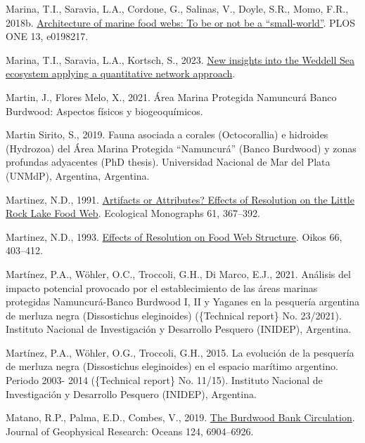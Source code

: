 \documentclass[
]{article}
\newlength{\cslhangindent}
\newenvironment{CSLReferences}[2] %
 {\begin{list}{}{%
  \setlength{\itemindent}{0pt}
  \setlength{\leftmargin}{0pt}
  \setlength{\parsep}{0pt}
  \ifodd #1
   \setlength{\leftmargin}{\cslhangindent}
   \setlength{\itemindent}{-1\cslhangindent}
  \fi
  \setlength{\itemsep}{#2\baselineskip}}}
 {\end{list}}
\begin{document}
\begin{CSLReferences}{1}{0}
Marina, T.I., Saravia, L.A., Cordone, G., Salinas, V., Doyle, S.R.,
Momo, F.R., 2018b.
\href{https://doi.org/10.1371/journal.pone.0198217}{Architecture of
marine food webs: {To} be or not be a {``small-world''}}. PLOS ONE 13,
e0198217.

Marina, T.I., Saravia, L.A., Kortsch, S., 2023.
\href{https://doi.org/10.5194/egusphere-2022-1518}{New insights into the
{Weddell Sea} ecosystem applying a quantitative network approach}.

Martin, J., Flores Melo, X., 2021. {{Á}rea Marina Protegida Namuncur{á}
Banco Burdwood: Aspectos f{í}sicos y biogeoqu{í}micos}.

Martin Sirito, S., 2019. {Fauna asociada a corales (Octocorallia) e
hidroides (Hydrozoa) del {Á}rea Marina Protegida {``Namuncur{á}''}
(Banco Burdwood) y zonas profundas adyacentes} (PhD thesis). Universidad
Nacional de Mar del Plata (UNMdP), Argentina, {Argentina}.

Martinez, N.D., 1991. \href{https://doi.org/10.2307/2937047}{Artifacts
or {Attributes}? {Effects} of {Resolution} on the {Little Rock Lake Food
Web}}. Ecological Monographs 61, 367--392.

Martinez, N.D., 1993. \href{https://doi.org/10.2307/3544934}{Effects of
{Resolution} on {Food Web Structure}}. Oikos 66, 403--412.

Martínez, P.A., Wöhler, O.C., Troccoli, G.H., Di Marco, E.J., 2021.
{An{á}lisis del impacto potencial provocado por el establecimiento de
las {á}reas marinas protegidas Namuncur{á}-Banco Burdwood I, II y
Yaganes en la pesquer{í}a argentina de merluza negra (Dissostichus
eleginoides)} (\{Technical report\} No. 23/2021). {Instituto Nacional de
Investigaci{ó}n y Desarrollo Pesquero (INIDEP), Argentina}.

Martínez, P.A., Wöhler, O.G., Troccoli, G.H., 2015. {La evoluci{ó}n de
la pesquer{í}a de merluza negra (Dissostichus eleginoides) en el espacio
mar{í}timo argentino. Periodo 2003- 2014} (\{Technical report\} No.
11/15). {Instituto Nacional de Investigaci{ó}n y Desarrollo Pesquero
(INIDEP), Argentina}.

Matano, R.P., Palma, E.D., Combes, V., 2019.
\href{https://doi.org/10.1029/2019JC015001}{The {Burdwood Bank
Circulation}}. Journal of Geophysical Research: Oceans 124, 6904--6926.


\end{CSLReferences}
\end{document}
